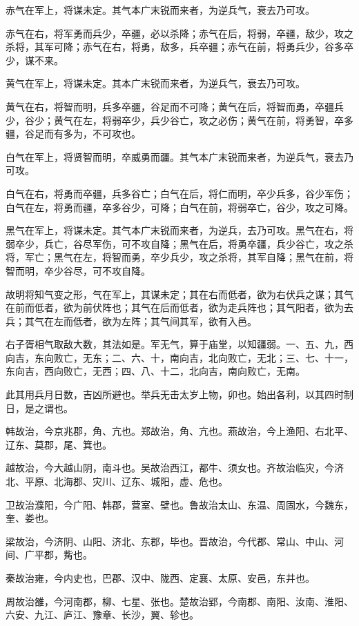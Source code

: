 \documentclass[12pt,UTF8]{ctexbook}
\begin{document}
赤气在军上，将谋未定。其气本广末锐而来者，为逆兵气，衰去乃可攻。

赤气在右，将军勇而兵少，卒疆，必以杀降；赤气在后，将弱，卒疆，敌少，攻之杀将，其军可降；赤气在右，将勇，敌多，兵卒疆；赤气在前，将勇兵少，谷多卒少，谋不来。

黄气在军上，将谋未定。其本广末锐而来者，为逆兵气，衰去乃可攻。

黄气在右，将智而明，兵多卒疆，谷足而不可降；黄气在后，将智而勇，卒疆兵少，谷少；黄气在左，将弱卒少，兵少谷亡，攻之必伤；黄气在前，将勇智，卒多疆，谷足而有多为，不可攻也。

白气在军上，将贤智而明，卒威勇而疆。其气本广末锐而来者，为逆兵气，衰去乃可攻。

白气在右，将勇而卒疆，兵多谷亡；白气在后，将仁而明，卒少兵多，谷少军伤；白气在左，将勇而疆，卒多谷少，可降；白气在前，将弱卒亡，谷少，攻之可降。

黑气在军上，将谋未定。其气本广末锐而来者，为逆兵，去乃可攻。黑气在右，将弱卒少，兵亡，谷尽军伤，可不攻自降；黑气在后，将勇卒疆，兵少谷亡，攻之杀将，军亡；黑气在左，将智而勇，卒少兵少，攻之杀将，其军自降；黑气在前，将智而明，卒少谷尽，可不攻自降。

故明将知气变之形，气在军上，其谋未定；其在右而低者，欲为右伏兵之谋；其气在前而低者，欲为前伏阵也；其气在后而低者，欲为走兵阵也；其气阳者，欲为去兵；其气在左而低者，欲为左阵；其气间其军，欲有入邑。

右子胥相气取敌大数，其法如是。军无气，算于庙堂，以知疆弱。一、五、九，西向吉，东向败亡，无东；二、六、十，南向吉，北向败亡，无北；三、七、十一，东向吉，西向败亡，无西；四、八、十二，北向吉，南向败亡，无南。

此其用兵月日数，吉凶所避也。举兵无击太岁上物，卯也。始出各利，以其四时制日，是之谓也。

韩故治，今京兆郡，角、亢也。郑故治，角、亢也。燕故治，今上渔阳、右北平、辽东、莫郡，尾、箕也。

越故治，今大越山阴，南斗也。吴故治西江，都牛、须女也。齐故治临灾，今济北、平原、北海郡、灾川、辽东、城阳，虚、危也。

卫故治濮阳，今广阳、韩郡，营室、壁也。鲁故治太山、东温、周固水，今魏东，奎、娄也。

梁故治，今济阴、山阳、济北、东郡，毕也。晋故治，今代郡、常山、中山、河间、广平郡，觜也。

秦故治雍，今内史也，巴郡、汉中、陇西、定襄、太原、安邑，东井也。

周故治雒，今河南郡，柳、七星、张也。楚故治郢，今南郡、南阳、汝南、淮阳、六安、九江、庐江、豫章、长沙，翼、轸也。
\end{document}
